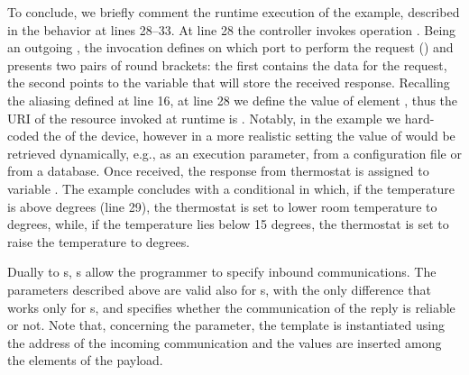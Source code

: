 To conclude, we briefly comment the runtime execution of the example, described
in the behavior at lines 28--33. At line 28 the controller invokes operation
. Being an outgoing , the
invocation defines on which port to perform the request ()
and presents two pairs of round brackets: the first contains the data for the
request, the second points to the variable that will store the received
response. Recalling the aliasing defined at line 16, at line 28 we define the
value of element , thus the URI of the resource invoked at
runtime is . Notably, in the
example we hard-coded the  of the device, however in a more realistic
setting the value of  would be retrieved dynamically, e.g., as an
execution parameter, from a configuration file or from a database. Once
received, the response from thermostat  is assigned to variable
. The example concludes with a conditional in which, if the
temperature is above  degrees (line 29), the thermostat is set to lower room
temperature to  degrees, while, if the temperature lies below \code
{15} degrees, the thermostat is set to raise the temperature to 
degrees.

Dually to s, s allow the programmer
to specify inbound communications. The parameters described above are valid also
for s, with the only difference that
 works only for s, and
specifies whether the communication of the reply is reliable or not. 
%
Note that, concerning the  parameter, the template is instantiated
using the address of the incoming communication and the values are inserted
among the elements of the payload.
